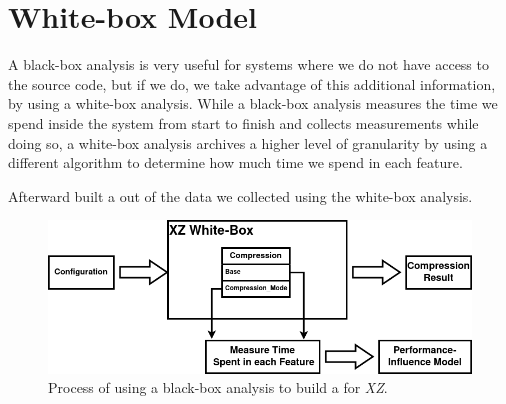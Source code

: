 



\section{White-box Model}\label{ch:Whitebox}
A black-box analysis is very useful for systems where we do not have access to the source code, but if we do, we take advantage of this additional information,
by using a white-box analysis. 
While a black-box analysis measures the time we spend inside the system from start to finish and collects measurements while doing so, 
a white-box analysis archives a higher level of granularity by using a different algorithm to determine how much time we spend in each feature.

Afterward built a {\perfInfluenceModel} out of the data we collected using the white-box analysis.

\begin{figure}[h]
    \centering
    \includegraphics[scale=0.55]{gfx/whitebox_2.png}
    \caption{Process of using a black-box analysis to build a \perfInfluenceModel for \textit{XZ}.}
    \label{fig:WBxz}
\end{figure}


